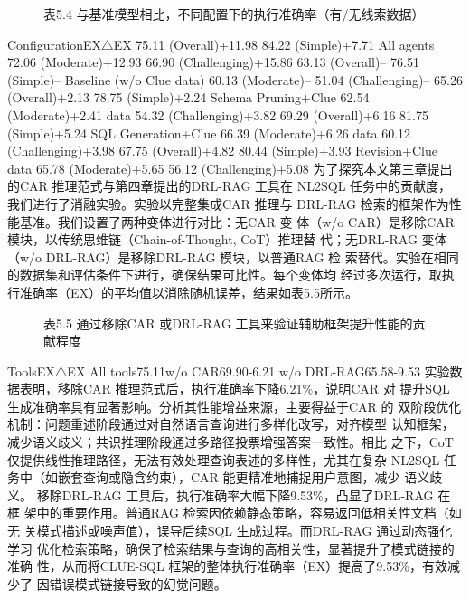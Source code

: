 \documentclass[12pt,a4paper,openright,UTF8]{ctexbook}
\begin{document}
\begin{figure}[htbp]
\centering
{}
\caption{表5.4 与基准模型相比，不同配置下的执行准确率（有/无线索数据）}
\end{figure}

ConfigurationEX$\triangle$EX 75.11 (Overall)+11.98 84.22 (Simple)+7.71 All agents 72.06 (Moderate)+12.93 66.90 (Challenging)+15.86 63.13 (Overall)– 76.51 (Simple)– Baseline (w/o Clue data) 60.13 (Moderate)– 51.04 (Challenging)– 65.26 (Overall)+2.13 78.75 (Simple)+2.24 Schema Pruning+Clue 62.54 (Moderate)+2.41 data 54.32 (Challenging)+3.82 69.29 (Overall)+6.16 81.75 (Simple)+5.24 SQL Generation+Clue 66.39 (Moderate)+6.26 data 60.12 (Challenging)+3.98 67.75 (Overall)+4.82 80.44 (Simple)+3.93 Revision+Clue data 65.78 (Moderate)+5.65 56.12 (Challenging)+5.08 为了探究本文第三章提出的CAR 推理范式与第四章提出的DRL-RAG 工具在 NL2SQL 任务中的贡献度，我们进行了消融实验。实验以完整集成CAR 推理与 DRL-RAG 检索的框架作为性能基准。我们设置了两种变体进行对比：无CAR 变 体（w/o CAR）是移除CAR 模块，以传统思维链（Chain-of-Thought, CoT）推理替 代；无DRL-RAG 变体（w/o DRL-RAG）是移除DRL-RAG 模块，以普通RAG 检 索替代。实验在相同的数据集和评估条件下进行，确保结果可比性。每个变体均 经过多次运行，取执行准确率（EX）的平均值以消除随机误差，结果如表5.5所示。

\begin{figure}[htbp]
\centering
{}
\caption{表5.5 通过移除CAR 或DRL-RAG 工具来验证辅助框架提升性能的贡献程度}
\end{figure}

ToolsEX$\triangle$EX All tools75.11w/o CAR69.90-6.21 w/o DRL-RAG65.58-9.53 实验数据表明，移除CAR 推理范式后，执行准确率下降6.21\%，说明CAR 对 提升SQL 生成准确率具有显著影响。分析其性能增益来源，主要得益于CAR 的 双阶段优化机制：问题重述阶段通过对自然语言查询进行多样化改写，对齐模型 认知框架，减少语义歧义；共识推理阶段通过多路径投票增强答案一致性。相比 之下，CoT 仅提供线性推理路径，无法有效处理查询表述的多样性，尤其在复杂 NL2SQL 任务中（如嵌套查询或隐含约束），CAR 能更精准地捕捉用户意图，减少 语义歧义。 移除DRL-RAG 工具后，执行准确率大幅下降9.53\%，凸显了DRL-RAG 在框 架中的重要作用。普通RAG 检索因依赖静态策略，容易返回低相关性文档（如无 关模式描述或噪声值），误导后续SQL 生成过程。而DRL-RAG 通过动态强化学习 优化检索策略，确保了检索结果与查询的高相关性，显著提升了模式链接的准确 性，从而将CLUE-SQL 框架的整体执行准确率（EX）提高了9.53\%，有效减少了 因错误模式链接导致的幻觉问题。
\end{document}
